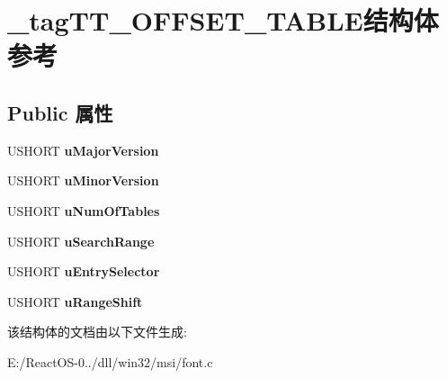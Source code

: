 \hypertarget{struct__tag_t_t___o_f_f_s_e_t___t_a_b_l_e}{}\section{\+\_\+tag\+T\+T\+\_\+\+O\+F\+F\+S\+E\+T\+\_\+\+T\+A\+B\+L\+E结构体 参考}
\label{struct__tag_t_t___o_f_f_s_e_t___t_a_b_l_e}
\subsection*{Public 属性}
\begin{DoxyCompactItemize}
\item 
\mbox{\label{struct__tag_t_t___o_f_f_s_e_t___t_a_b_l_e_a7734632ad0ebb1fef15a126cdee1e836}} 
U\+S\+H\+O\+RT {\bfseries u\+Major\+Version}
\item 
\mbox{\label{struct__tag_t_t___o_f_f_s_e_t___t_a_b_l_e_a9d27aae9c227519ebffe07025ef5ab1d}} 
U\+S\+H\+O\+RT {\bfseries u\+Minor\+Version}
\item 
\mbox{\label{struct__tag_t_t___o_f_f_s_e_t___t_a_b_l_e_ab61092c350f6b016c820ff7600e948de}} 
U\+S\+H\+O\+RT {\bfseries u\+Num\+Of\+Tables}
\item 
\mbox{\label{struct__tag_t_t___o_f_f_s_e_t___t_a_b_l_e_ab6989272f946ca12d1df1d7c5fa50fe3}} 
U\+S\+H\+O\+RT {\bfseries u\+Search\+Range}
\item 
\mbox{\label{struct__tag_t_t___o_f_f_s_e_t___t_a_b_l_e_aef431070af08987042c64b40b39da696}} 
U\+S\+H\+O\+RT {\bfseries u\+Entry\+Selector}
\item 
\mbox{\label{struct__tag_t_t___o_f_f_s_e_t___t_a_b_l_e_ab74ea2b8071182289c0e2063cc4c5c01}} 
U\+S\+H\+O\+RT {\bfseries u\+Range\+Shift}
\end{DoxyCompactItemize}


该结构体的文档由以下文件生成\+:\begin{DoxyCompactItemize}
\item 
E\+:/\+React\+O\+S-\/0../dll/win32/msi/font.\+c\end{DoxyCompactItemize}
